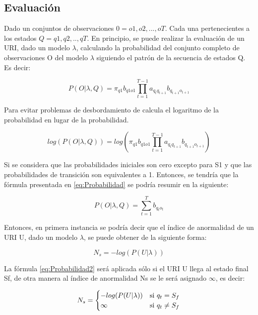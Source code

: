 \subsection*{Evaluación}
\label{subsec:exprIndice}

Dado un conjuntos de observaciones $0 = o1,o2,...,oT$. Cada una pertenecientes a los estados $Q = q1,q2,..,qT$. En principio, se puede realizar la evaluación de un URI, dado un modelo $\lambda$,  calculando la probabilidad del conjunto completo de observaciones O del modelo $\lambda$ siguiendo el patrón de la secuencia de estados Q. Es decir:

\begin{equation}
P(O|\lambda,Q) = \pi_{q1}b_{q1o1}\prod_{t=1}^{T-1}a_{q_{t}q_{t+1}}b_{q_{t+1}o_{t+1}}
\end{equation}

Para evitar problemas de desbordamiento de calcula el logaritmo de la probabilidad en lugar de la probabilidad.

\begin{equation}\label{eq:Probabilidad}
log(P(O|\lambda,Q)) = log(\pi_{q1}b_{q1o1}\prod_{t=1}^{T-1}a_{q_{t}q_{t+1}}b_{q_{t+1}o_{t+1}})
\end{equation}

Si se considera que las probabilidades iniciales son cero excepto para S1 y que las probabilidades de transición son equivalentes a 1. Entonces, se tendría que la fórmula presentada en \ref{eq:Probabilidad} se podría resumir en la siguiente:

\begin{equation}
P(O|\lambda,Q) = \sum_{t=1}^{T}b_{q_{t}o_{t}}
\end{equation}

Entonces, en primera instancia se podría decir que el índice de anormalidad de un URI U, dado un modelo $\lambda$, se puede obtener de la siguiente forma:

\begin{equation}\label{eq:Probabilidad2}
N_{s} = -log(P(U|\lambda))
\end{equation}

La fórmula \ref{eq:Probabilidad2} será aplicada sólo si el URI U llega al estado final Sf, de otra manera al índice de anormalidad Ns se le será asignado $\infty$, es decir:

\begin{equation}\label{eq:Ns1}
N_{s} = 
	\begin{cases} 
      -log(P(U|\lambda)) & $si $  q_{t} = S_{f} \\
      \infty & $si $  q_{t} \neq S_{f} \\ 
   \end{cases}
\end{equation}

